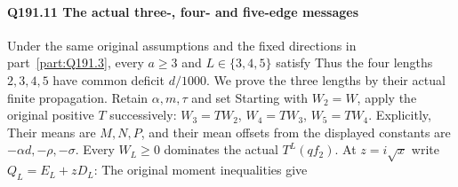 \paragraph{Q191.11 The actual three-, four- and five-edge messages}\label{part:Q191.11}
Under the same original assumptions and the fixed directions in
part~\ref{part:Q191.3}, every $a\ge\allowbreak 3$ and $L\in\{3,\allowbreak 4,\allowbreak 5\}$ satisfy
Thus the four lengths $2,\allowbreak 3,\allowbreak 4,\allowbreak 5$ have common deficit $d/1000$.
We prove the three lengths by their actual finite propagation.
Retain $\alpha,\allowbreak m,\allowbreak \tau$ and set
Starting with $W_2=\allowbreak W$, apply the original positive $T$ successively:
$W_3=\allowbreak TW_2$, $W_4=\allowbreak TW_3$, $W_5=\allowbreak TW_4$. Explicitly,
Their means are $M,\allowbreak N,\allowbreak P$, and their mean offsets from the displayed
constants are $-\alpha d,\allowbreak -\rho,\allowbreak -\sigma$. Every $W_L\ge\allowbreak 0$ dominates
the actual $T^L(qf_2)$. At $z=\allowbreak i\sqrt x$ write $Q_L=\allowbreak E_L+zD_L$:
The original moment inequalities give
